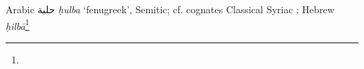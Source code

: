 \begin{etymology}\label{ety:hulba}
Arabic {حلبة} \textit{ḥulba} `fenugreek', Semitic; cf. cognates Classical Syriac ; Hebrew  \textit{ḥilbā}\footnote{}
\end{etymology}